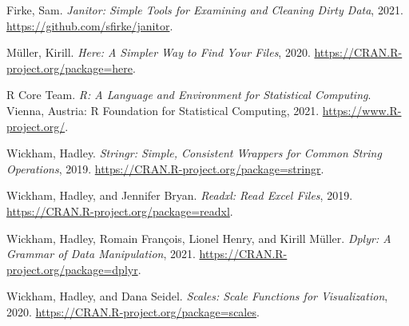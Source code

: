 \documentclass[
  12pt,
]{article}
\newlength{\cslhangindent}
\newenvironment{CSLReferences}[2] %
 {%
  \setlength{\parindent}{0pt}
  \ifodd #1 \everypar{\setlength{\hangindent}{\cslhangindent}}\ignorespaces\fi
  \ifnum #2 > 0
  \setlength{\parskip}{#2\baselineskip}
  \fi
 }%
 {}
\begin{document}
\hypertarget{refs}{}
\begin{CSLReferences}{1}{0}
\leavevmode{}%
Firke, Sam. \emph{Janitor: Simple Tools for Examining and Cleaning Dirty
Data}, 2021. \url{https://github.com/sfirke/janitor}.

\leavevmode{}%
Müller, Kirill. \emph{Here: A Simpler Way to Find Your Files}, 2020.
\url{https://CRAN.R-project.org/package=here}.

\leavevmode{}%
R Core Team. \emph{R: A Language and Environment for Statistical
Computing}. Vienna, Austria: R Foundation for Statistical Computing,
2021. \url{https://www.R-project.org/}.

\leavevmode{}%
Wickham, Hadley. \emph{Stringr: Simple, Consistent Wrappers for Common
String Operations}, 2019.
\url{https://CRAN.R-project.org/package=stringr}.

\leavevmode{}%
Wickham, Hadley, and Jennifer Bryan. \emph{Readxl: Read Excel Files},
2019. \url{https://CRAN.R-project.org/package=readxl}.

\leavevmode{}%
Wickham, Hadley, Romain François, Lionel Henry, and Kirill Müller.
\emph{Dplyr: A Grammar of Data Manipulation}, 2021.
\url{https://CRAN.R-project.org/package=dplyr}.

\leavevmode{}%
Wickham, Hadley, and Dana Seidel. \emph{Scales: Scale Functions for
Visualization}, 2020. \url{https://CRAN.R-project.org/package=scales}.

\end{CSLReferences}
\end{document}
